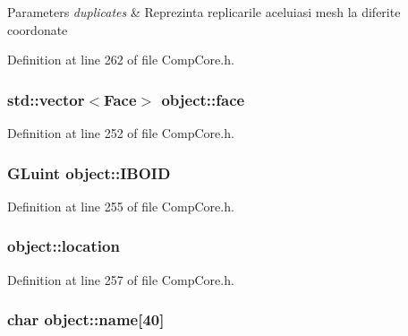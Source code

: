 \begin{DoxyParams}{Parameters}
{\em duplicates} & Reprezinta replicarile aceluiasi mesh la diferite coordonate \\
\hline
\end{DoxyParams}


Definition at line 262 of file Comp\-Core.\-h.

\hypertarget{structobject_abd80dcad30e5ad35a5b85e091d3dcdce}{
\subsubsection[{face}]{\setlength{\rightskip}{0pt plus 5cm}std\-::vector$<${\bf Face}$>$ object\-::face}}\label{structobject_abd80dcad30e5ad35a5b85e091d3dcdce}


Definition at line 252 of file Comp\-Core.\-h.

\hypertarget{structobject_a2172358a3a70a1ae7cacf9d42d2f81d0}{
\subsubsection[{I\-B\-O\-I\-D}]{\setlength{\rightskip}{0pt plus 5cm}G\-Luint object\-::\-I\-B\-O\-I\-D}}\label{structobject_a2172358a3a70a1ae7cacf9d42d2f81d0}


Definition at line 255 of file Comp\-Core.\-h.

\hypertarget{structobject_ada1bd59a43bb6fd1698897cbc307ace9}{
\subsubsection[{location}]{ object\-::location}}\label{structobject_ada1bd59a43bb6fd1698897cbc307ace9}


Definition at line 257 of file Comp\-Core.\-h.

\hypertarget{structobject_a0c84bc492e5b46a04639699248aac2bf}{
\subsubsection[{name}]{\setlength{\rightskip}{0pt plus 5cm}char object\-::name\mbox{[}40\mbox{]}}}\label{structobject_a0c84bc492e5b46a04639699248aac2bf}



